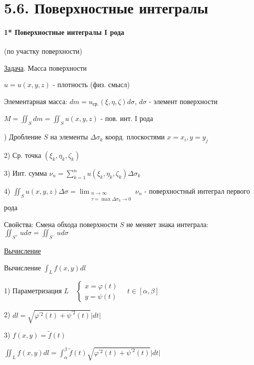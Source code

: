 \documentclass[12pt]{article}
\begin{document}
    \section{5.6. Поверхностные интегралы}

    \hypertarget{surfaceintegraloffirstkind}{}

    \paragraph{1* Поверхностные интегралы I рода} (по участку поверхности)

    \underline{Задача}. Масса поверхности

    $u = u(x, y, z)$ - плотность (физ. смысл)

    Элементарная масса: $dm = u_{\text{ср.}}(\xi, \eta, \zeta) d\sigma$, $d\sigma$ - элемент поверхности

    $M = \iint_S dm = \iint_S u(x, y, z)$ - пов. инт. I рода

    ) Дробление $S$ на элементы $\Delta \sigma_k$ коорд. плоскостями $x = x_i, y = y_j$

    2) Ср. точка $(\xi_k, \eta_k, \zeta_k)$

    3) Инт. сумма $\nu_n = \sum_{k = 1}^{n} u(\xi_k, \eta_k, \zeta_k) \Delta \sigma_k$

    4) $\iint_S u(x, y, z) \Delta \sigma = \lim_{\substack{n \to \infty \\ \tau = \max \Delta \sigma_k \to 0}} \nu_n$ - поверхностный интеграл первого рода

    \hypertarget{surfaceintegraloffirstkindproperties}{}

    Свойства: Смена обхода поверхности $S$ не меняет знака интеграла: $\iint_{S^+} u d\sigma = \iint_{S^-} u d\sigma$

    \mediumvspace


    \underline{Вычисление}

    \Mems Вычисление $\int_L f(x, y) dl$

    1) Параметризация $L \quad \begin{cases}x = \varphi(t) \\ y = \psi(t)\end{cases} \quad t \in [\alpha, \beta]$

    2) $dl = \sqrt{\varphi^{\prime 2}(t) + \psi^{\prime 2}(t)} |dt|$

    3) $f(x, y) = \tilde{f}(t)$

    $\iint_L f(x, y)dl = \int_\alpha^\beta \tilde{f}(t) \sqrt{\varphi^{\prime 2}(t) + \psi^{\prime 2}(t)} |dt|$
\end{document}
